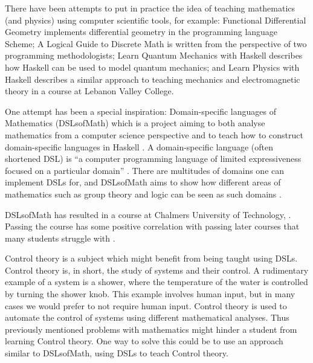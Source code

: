 There have been attempts to put in practice the idea of teaching mathematics (and physics) using computer scientific tools, for example: 
Functional Differential Geometry \cite{sussman2013} implements differential geometry in the programming language Scheme;
A Logical Guide to Discrete Math \cite{gries2013logical} is written from the perspective of two programming methodologists; 
Learn Quantum Mechanics with Haskell \cite{quantumwithhaskell} describes how Haskell can be used to model quantum mechanics; and Learn Physics with Haskell \cite{physicswithhaskell} describes a similar approach to teaching mechanics and electromagnetic theory in a course at Lebanon Valley College. %

One attempt has been a special inspiration: Domain-specific languages of Mathematics (DSLsofMath) which is a project aiming to both analyse mathematics from a computer science perspective and to teach how to construct domain-specific languages in Haskell \cite[p.~6]{dslsofmath}. A domain-specific language (often shortened DSL) is ``a computer programming language of limited expressiveness focused on a particular domain'' \cite[p.~27]{fowler_parsons_2010}.
There are multitudes of domains one can implement DSLs for, and DSLsofMath aims to show how different areas of mathematics such as group theory and logic can be seen as such domains \cite[p.~5--6]{dslsofmath}.

DSLsofMath has resulted in a course at Chalmers University of Technology, . Passing the course has some positive correlation with passing later courses that many students struggle with \cite[p.~85]{Jansson_2019}. %


Control theory is a subject which might benefit from being taught using DSLs. Control theory is, in short, the study of systems and their control. 
A rudimentary example of a system is a shower, where the temperature of the water is controlled by turning the shower knob. This example involves human input, but in many cases we would prefer to not require human input. Control theory is used to automate the control of systems using different mathematical analyses. Thus previously mentioned problems with mathematics might hinder a student from learning Control theory. One way to solve this could be to use an approach similar to DSLsofMath, using DSLs to teach Control theory.

